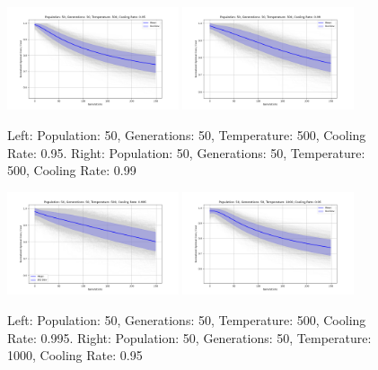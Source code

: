 \documentclass{article}
\begin{document}
    \begin{figure}[H]
        \centering
        \includegraphics[width=0.45\textwidth]{genetic_simulated_annealing_hybrid/appendix/Population_50_Generations_50_Temperature_500_CoolingRate_0.95.png}
        \includegraphics[width=0.45\textwidth]{genetic_simulated_annealing_hybrid/appendix/Population_50_Generations_50_Temperature_500_CoolingRate_0.99.png}
        \caption{Left: Population: 50, Generations: 50, Temperature: 500, Cooling Rate: 0.95. Right: Population: 50, Generations: 50, Temperature: 500, Cooling Rate: 0.99}
        \label{fig:app_ga_50_50_500_95_99}
    \end{figure}

    \begin{figure}[H]
        \centering
        \includegraphics[width=0.45\textwidth]{genetic_simulated_annealing_hybrid/appendix/Population_50_Generations_50_Temperature_500_CoolingRate_0.995.png}
        \includegraphics[width=0.45\textwidth]{genetic_simulated_annealing_hybrid/appendix/Population_50_Generations_50_Temperature_1000_CoolingRate_0.95.png}
        \caption{Left: Population: 50, Generations: 50, Temperature: 500, Cooling Rate: 0.995. Right: Population: 50, Generations: 50, Temperature: 1000, Cooling Rate: 0.95}
        \label{fig:app_ga_50_50_500_995_1000_95}
    \end{figure}
\end{document}
